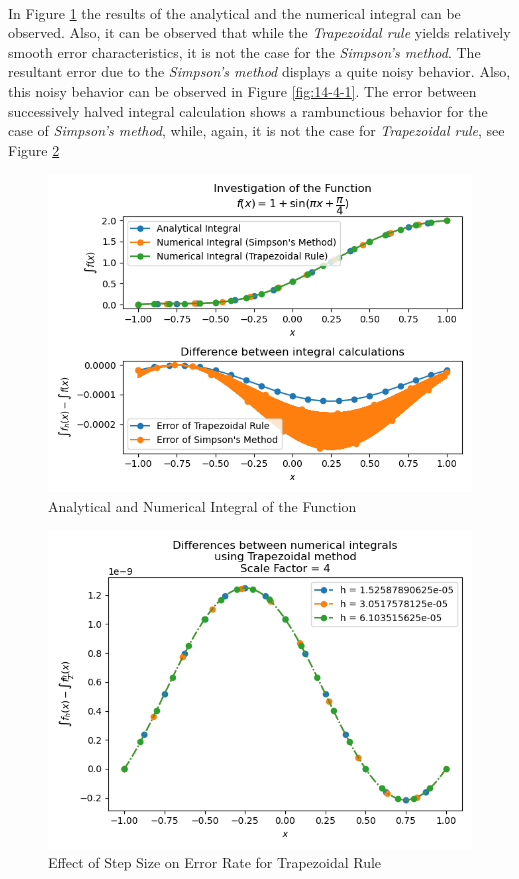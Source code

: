 \documentclass[letterpaper,12pt]{article}
\begin{document}
\paragraph{} In Figure \ref{fig:14-3} the results of the analytical and the numerical integral can be observed. Also, it can be observed that while the \textit{Trapezoidal rule} yields relatively smooth error characteristics, it is not the case for the \textit{Simpson's method}. The resultant error due to the \textit{Simpson's method} displays a quite noisy behavior. Also, this noisy behavior can be observed in Figure \ref{fig:14-4-1}. The error between successively halved integral calculation shows a rambunctious behavior for the case of \textit{Simpson's method}, while, again, it is not the case for \textit{Trapezoidal rule}, see Figure \ref{fig:14-4-0} 
\begin{figure}[H]
\centerline{\includegraphics[width=1.0\linewidth]{figures/14-3.png}}
\caption{Analytical and Numerical Integral of the Function}
\label{fig:14-3}
\end{figure}

\begin{figure}[H]
\centerline{\includegraphics[width=0.7\linewidth]{figures/14-4-0.png}}
\caption{Effect of Step Size on Error Rate for Trapezoidal Rule}
\label{fig:14-4-0}
\end{figure}
\end{document}
